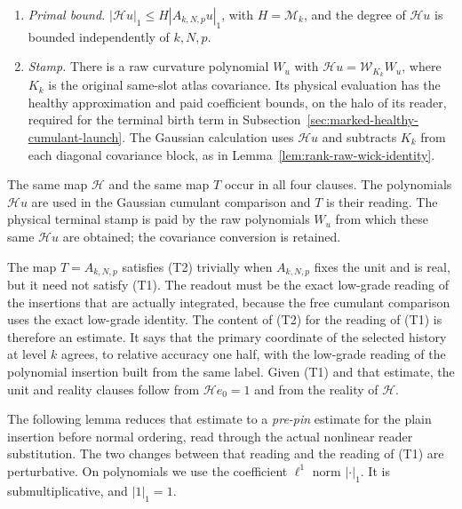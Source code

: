 \begin{enumerate}
\begin{enumerate}
  $|A_{k,N,p}v-Tv|_1\le\frac12|A_{k,N,p}v|_1$.
 \item[(T3)] \emph{Primal bound.} $|\mathcal Hu|_1\le H|A_{k,N,p}u|_1$,
  with $H=\mathcal M_k$, and the degree of $\mathcal Hu$ is bounded
  independently of $k,N,p$.
 \item[(T4)] \emph{Stamp.} There is a raw curvature polynomial $W_u$ with
  $\mathcal H u=\mathcal W_{K_k}W_u$, where $K_k$ is the original
  same-slot atlas covariance. Its physical evaluation has the healthy
  approximation and paid coefficient bounds, on the halo of its reader,
  required for the terminal birth term in
  Subsection~\ref{sec:marked-healthy-cumulant-launch}. The Gaussian
  calculation uses $\mathcal H u$ and subtracts $K_k$ from each
  diagonal covariance block, as in
  Lemma~\ref{lem:rank-raw-wick-identity}.
 \end{enumerate}
 The same map $\mathcal H$ and the same map $T$ occur in all four
 clauses. The polynomials $\mathcal Hu$ are used in the Gaussian
 cumulant comparison and $T$ is their reading. The physical terminal
 stamp is paid by the raw polynomials $W_u$ from which these same
 $\mathcal Hu$ are obtained; the covariance conversion is retained.
\end{enumerate}
The map $T=A_{k,N,p}$ satisfies (T2) trivially when $A_{k,N,p}$ fixes the
unit and is real, but it need not satisfy (T1). The readout must be the
exact low-grade reading of the insertions that are actually integrated,
because the free cumulant comparison uses the exact low-grade identity.
The content of (T2) for the reading of (T1) is therefore an estimate. It
says that the primary coordinate of the selected history at level $k$
agrees, to relative accuracy one half, with the low-grade reading of the
polynomial insertion built from the same label. Given (T1) and that
estimate, the unit and reality clauses follow from $\mathcal He_0=1$ and
from the reality of $\mathcal H$.

The following lemma reduces that estimate to a \emph{pre-pin} estimate for
the plain insertion before normal ordering, read through the actual
nonlinear reader substitution. The two changes between that reading and
the reading of (T1) are perturbative. On polynomials we use the
coefficient $\ell^1$ norm $|\cdot|_1$. It is submultiplicative, and
$|1|_1=1$.

